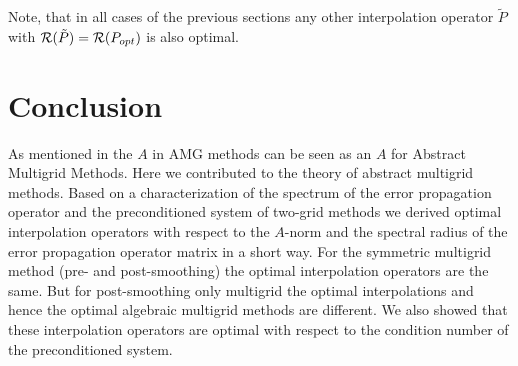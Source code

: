 \documentclass[final]{siamltex}
\numberwithin{equation}{section}
\newcommand{\ran} {{\cal R}}
\begin{document}
Note, that  in all cases of the previous sections any other interpolation
operator $\tilde P$  with  $\ran (\tilde P) = \ran (P_{opt})$ is also optimal.

\section{Conclusion}
As mentioned in \cite{XuZ17} the  $A$ in AMG methods can be seen as an $A$ for 
Abstract 
Multigrid Methods. Here  we contributed to the  theory of  
abstract multigrid methods. Based on a characterization of the spectrum of the
error propagation operator and the preconditioned system of two-grid methods
we derived optimal interpolation operators with respect  to the $A$-norm and
the spectral radius of the  error propagation operator matrix in a
short way. For the symmetric multigrid method (pre- and  post-smoothing) the
optimal interpolation operators are  the same. But for post-smoothing only
multigrid the optimal interpolations and hence the optimal algebraic multigrid
methods are different. We also showed that these interpolation operators
are optimal  with respect to the condition number of the preconditioned system.







%

\end{document}
